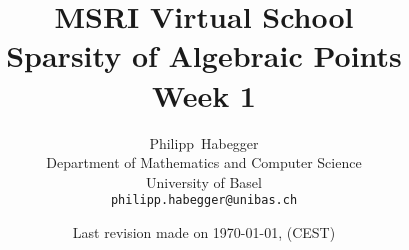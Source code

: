 \documentclass{scrbook}
\begin{document}
\title{MSRI Virtual School \\ Sparsity of Algebraic Points \\ Week 1}
\author{Philipp~Habegger \\ Department of Mathematics and Computer
  Science \\ University of Basel \\ \texttt{philipp.habegger@unibas.ch}}
\date{Last revision made on \today, \currenttime (CEST)}

\maketitle
\tableofcontents

\setcounter{chapter}{-1}














\end{document}

